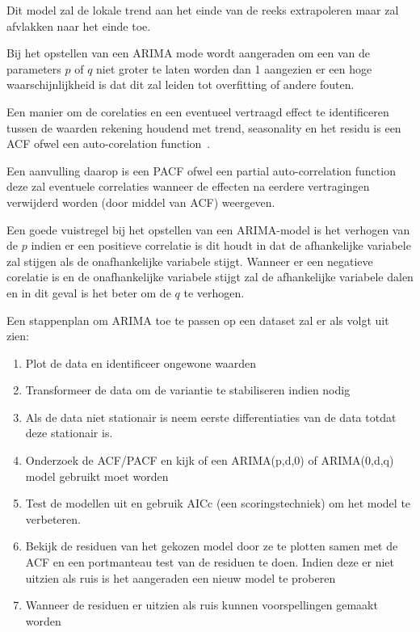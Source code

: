 Dit model zal de lokale trend aan het einde van de reeks extrapoleren maar zal afvlakken naar het einde toe. 

Bij het opstellen van een ARIMA mode wordt aangeraden om een van de parameters $p$ of $q$ niet groter te laten worden dan 1 aangezien er een hoge waarschijnlijkheid is dat dit zal leiden tot overfitting of andere fouten.

Een manier om de corelaties en een eventueel vertraagd effect te identificeren tussen de waarden rekening houdend met trend, seasonality en het residu is een ACF ofwel een auto-corelation function~\autocite{Salvi2020}.

Een aanvulling daarop is een PACF ofwel een partial auto-correlation function deze zal eventuele correlaties wanneer de effecten na eerdere vertragingen verwijderd worden (door middel van ACF) weergeven. 

Een goede vuistregel bij het opstellen van een ARIMA-model is het verhogen van de $p$ indien er een positieve correlatie is dit houdt in dat de afhankelijke variabele zal stijgen als de onafhankelijke variabele stijgt. Wanneer er een negatieve corelatie is en de onafhankelijke variabele stijgt zal de afhankelijke variabele dalen en in dit geval is het beter om de $q$ te verhogen.

Een stappenplan om ARIMA toe te passen op een dataset zal er als volgt uit zien:

\begin{enumerate}
    \item Plot de data en identificeer ongewone waarden
    \item Transformeer de data om de variantie te stabiliseren indien nodig
    \item Als de data niet stationair is neem eerste differentiaties van de data totdat deze stationair is.
    \item Onderzoek de ACF/PACF en kijk of een ARIMA(p,d,0) of ARIMA(0,d,q) model gebruikt moet worden
    \item Test de modellen uit en gebruik AICc (een scoringstechniek) om het model te verbeteren.
    \item Bekijk de residuen van het gekozen model door ze te plotten samen met de ACF en een portmanteau test van de residuen te doen. Indien deze er niet uitzien als ruis is het aangeraden een nieuw model te proberen
    \item Wanneer de residuen er uitzien als ruis kunnen voorspellingen gemaakt worden   
\end{enumerate}


